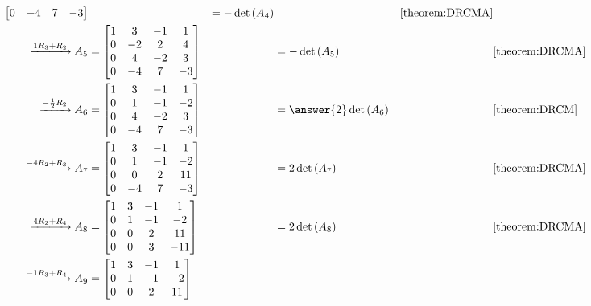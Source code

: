 \documentclass{ximera}
\begin{document}
\begin{example}
\begin{align*}
\begin{bmatrix}
           0 &-4 & 7 &-3
         \end{bmatrix}
                   &
           &=-\detname{A_4}&&\ref{theorem:DRCMA}\\
    \xrightarrow{\rowopadd{1}{3}{2}}
    A_5&=
         \begin{bmatrix}
           1 & 3 &-1 & 1 \\
           0 &-2 & 2 & 4 \\
           0 & 4 &-2 & 3 \\
           0 &-4 & 7 &-3
         \end{bmatrix}
                   &
           &=-\detname{A_5}&&\ref{theorem:DRCMA}\\
    \xrightarrow{\rowopmult{-\frac{1}{2}}{2}}
    A_6&=
         \begin{bmatrix}
           1 & 3 &-1 & 1 \\
           0 & 1 &-1 &-2 \\
           0 & 4 &-2 & 3 \\
           0 &-4 & 7 &-3
         \end{bmatrix}
                   &
           &=\answer{2}\detname{A_6}&&\ref{theorem:DRCM}\\
    \xrightarrow{\rowopadd{-4}{2}{3}}
    A_7&=
         \begin{bmatrix}
           1 & 3 &-1 & 1 \\
           0 & 1 &-1 &-2 \\
           0 & 0 & 2 &11 \\
           0 &-4 & 7 &-3
         \end{bmatrix}
                   &
           &=2\detname{A_7}&&\ref{theorem:DRCMA}\\
    \xrightarrow{\rowopadd{4}{2}{4}}
    A_8&=
         \begin{bmatrix}
           1 & 3 &-1 & 1 \\
           0 & 1 &-1 &-2 \\
           0 & 0 & 2 &11 \\
           0 & 0 & 3 &-11
         \end{bmatrix}
                   &
           &=2\detname{A_8}&&\ref{theorem:DRCMA}\\
    \xrightarrow{\rowopadd{-1}{3}{4}}
    A_9&=
         \begin{bmatrix}
           1 & 3 &-1 & 1 \\
           0 & 1 &-1 &-2 \\
           0 & 0 & 2 &11 \\

\end{bmatrix}
\end{align*}
\end{example}
\end{document}
